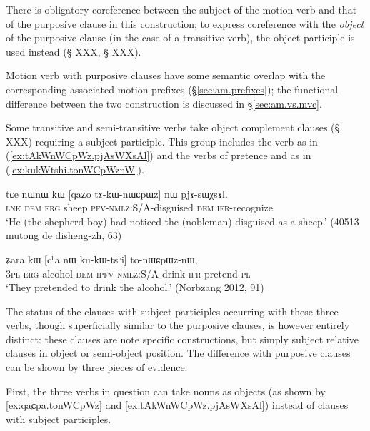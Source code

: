 There is obligatory coreference between the subject of the motion verb and that of the purposive clause in this construction; to express coreference with the \textit{object} of the purposive clause (in the case of a transitive verb), the object participle is used instead (§ XXX, § XXX). 

Motion verb with purposive clauses have some semantic overlap with the corresponding associated motion prefixes (§\ref{sec:am.prefixes}); the functional difference between the two construction is discussed in §\ref{sec:am.vs.mvc}.

Some transitive and semi-transitive verbs take object complement clauses (§ XXX) requiring a subject participle. This group includes the verb  as in (\ref{ex:tAkWnWCpWz.pjAsWXsAl}) and the verbs of pretence  and  as in (\ref{ex:kukWtshi.tonWCpWznW}). 

\begin{exe}
\ex \label{ex:tAkWnWCpWz.pjAsWXsAl}
 \gll tɕe nɯnɯ kɯ [qaʑo tɤ-kɯ-nɯɕpɯz] nɯ pjɤ-sɯχsɤl. \\
 \textsc{lnk} \textsc{dem} \textsc{erg} sheep \textsc{pfv}-\textsc{nmlz}:S/A-disguised \textsc{dem} \textsc{ifr}-recognize \\
\glt `He (the shepherd boy) had noticed the (nobleman) disguised as a sheep.' (40513 mutong de disheng-zh, 63)
\end{exe}

\begin{exe}
\ex \label{ex:kukWtshi.tonWCpWznW}
 \gll  ʑara kɯ [cʰa nɯ ku-kɯ-tsʰi] to-nɯɕpɯz-nɯ, \\
\textsc{3pl} \textsc{erg} alcohol \textsc{dem} \textsc{ipfv}-\textsc{nmlz}:S/A-drink \textsc{ifr}-pretend-\textsc{pl} \\
\glt  `They pretended to drink the alcohol.'  (Norbzang 2012, 91)
\end{exe}

The status of the clauses with subject participles occurring with these three verbs, though superficially similar to the purposive clauses, is however entirely distinct: these clauses are note specific constructions, but simply subject relative clauses in object or semi-object position. The difference with purposive clauses can be shown by three pieces of evidence. 

First, the three verbs in question can take nouns as objects (as shown by \ref{ex:qaɕpa.tonWCpWz} and \ref{ex:tAkWnWCpWz.pjAsWXsAl}) instead of clauses with subject participles. 

